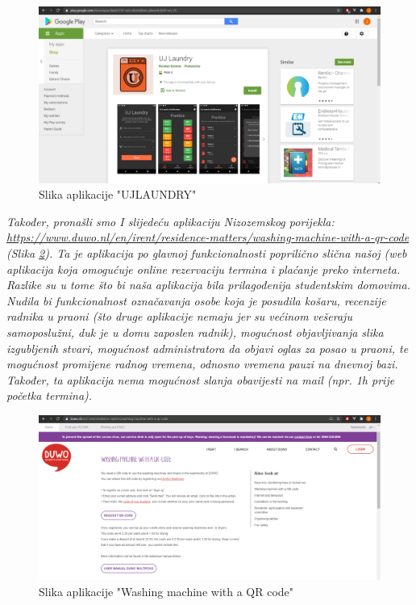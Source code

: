 			\begin{figure}[H]
				\includegraphics[width=.9\linewidth]{slike/UJLAUNDRY.PNG}
				\caption{Slika aplikacije "UJLAUNDRY"}
				\label{fig:ujlaundry}
			\end{figure}
		
			\textit{Također, pronašli smo I slijedeću aplikaciju Nizozemskog porijekla: \url{https://www.duwo.nl/en/irent/residence-matters/washing-machine-with-a-qr-code} (Slika  \ref{fig:duwo}). Ta je aplikacija po glavnoj funkcionalnosti 
			poprilično slična našoj (web aplikacija koja omogućuje online rezervaciju termina i plaćanje preko
			interneta. Razlike su u tome što bi naša aplikacija bila prilagođenija studentskim domovima. Nudila bi
			funkcionalnost označavanja osobe koja je posudila košaru, recenzije radnika u praoni (što druge
			aplikacije nemaju jer su većinom vešeraju samoposlužni, duk je u domu zaposlen radnik), mogućnost
			objavljivanja slika izgubljenih stvari, mogućnost administratora da objavi oglas za posao u praoni, te
			mogućnost promijene radnog vremena, odnosno vremena pauzi na dnevnoj bazi. Također, ta aplikacija
			nema mogućnost slanja obavijesti na mail (npr. 1h prije početka termina).}
		
			\begin{figure}[H]
				\includegraphics[width=.9\linewidth]{slike/DUWO.PNG}
				\caption{Slika aplikacije "Washing machine with a QR code"}
				\label{fig:duwo}
			\end{figure}
		
